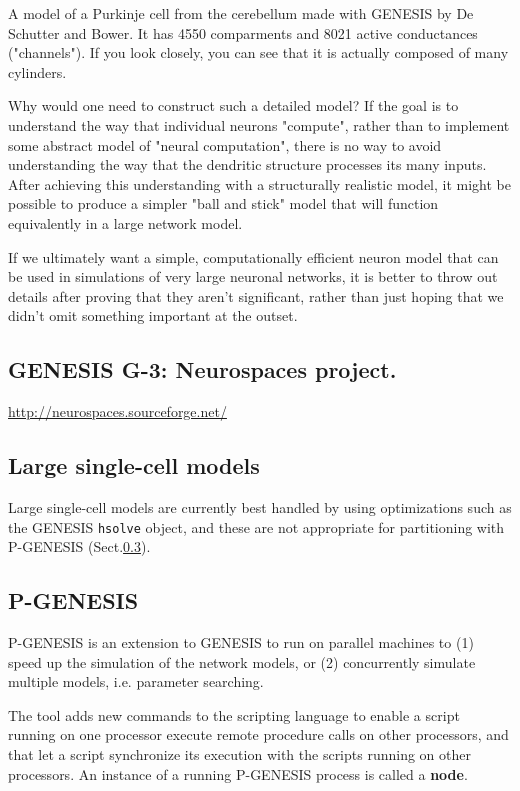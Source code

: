 A model of a Purkinje cell from the cerebellum made with GENESIS by De Schutter
and Bower. It has 4550 comparments and 8021 active conductances ("channels"). If
you look closely, you can see that it is actually composed of many cylinders.


Why would one need to construct such a detailed model? If the goal is to
understand the way that individual neurons "compute", rather than to implement
some abstract model of "neural computation", there is no way to avoid
understanding the way that the dendritic structure processes its many inputs.
After achieving this understanding with a structurally realistic model, it might
be possible to produce a simpler "ball and stick" model that will function
equivalently in a large network model.


If we ultimately want a simple, computationally efficient neuron model that can
be used in simulations of very large neuronal networks, it is better to throw
out details after proving that they aren't significant, rather than just hoping
that we didn't omit something important at the outset.

\subsection{GENESIS G-3: Neurospaces project.}
\label{sec:GENESIS-3.0}

\url{http://neurospaces.sourceforge.net/}


\subsection{Large single-cell models}

Large single-cell models are currently best handled by using optimizations such
as the GENESIS \verb!hsolve! object, and these are not appropriate for
partitioning with P-GENESIS (Sect.\ref{sec:P-GENESIS}).



\subsection{P-GENESIS}
\label{sec:P-GENESIS}

P-GENESIS is an extension to GENESIS to run on parallel machines to (1) speed up
the simulation of the network models, or (2) concurrently simulate multiple
models, i.e. parameter searching.

The tool adds new commands to the scripting language to enable a script running
on one processor execute remote procedure calls on other processors, and that
let a script synchronize its execution with the scripts running on other
processors. An instance of a running P-GENESIS process is
called a {\bf node}.

